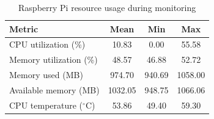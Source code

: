 \begin{table}[htbp]
\centering
\caption{Raspberry Pi resource usage during monitoring}
\label{tab:raspberry-pi-resource-usage}
\begin{tabular}{lccc}
\hline
Metric & Mean & Min & Max \\
\hline
CPU utilization (\%) & 10.83 & 0.00 & 55.58 \\
Memory utilization (\%) & 48.57 & 46.88 & 52.72 \\
Memory used (MB) & 974.70 & 940.69 & 1058.00 \\
Available memory (MB) & 1032.05 & 948.75 & 1066.06 \\
CPU temperature ($^\circ$C) & 53.86 & 49.40 & 59.30 \\
\hline
\end{tabular}
\end{table}
